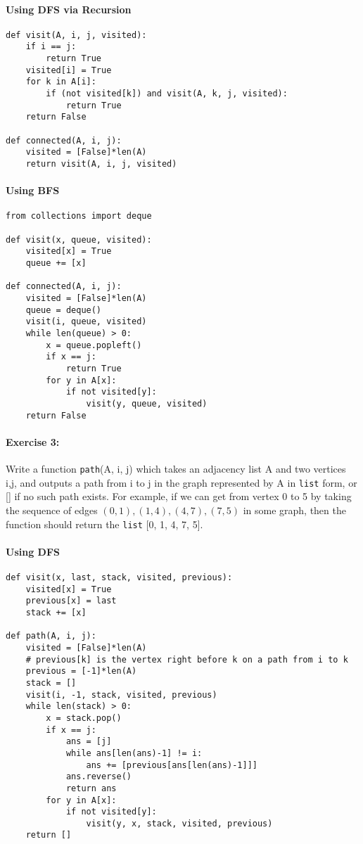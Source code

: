 \documentclass[11pt]{article}
\begin{document}
\paragraph{Using DFS via Recursion}

\begin{verbatim}
def visit(A, i, j, visited):
    if i == j:
        return True
    visited[i] = True
    for k in A[i]:
        if (not visited[k]) and visit(A, k, j, visited):
            return True
    return False

def connected(A, i, j):
    visited = [False]*len(A)
    return visit(A, i, j, visited)
\end{verbatim}

\paragraph{Using BFS}
\begin{verbatim}
from collections import deque

def visit(x, queue, visited):
    visited[x] = True
    queue += [x]

def connected(A, i, j):
    visited = [False]*len(A)
    queue = deque()
    visit(i, queue, visited)
    while len(queue) > 0:
        x = queue.popleft()
        if x == j:
            return True
        for y in A[x]:
            if not visited[y]:
                visit(y, queue, visited)
    return False
\end{verbatim}

\paragraph{Exercise 3:}
Write a function \texttt{path}(A, i, j) which takes an adjacency
list A and two vertices i,j, and outputs a path from i to j
in the graph represented by A in \texttt{list} form, or [] if no such
path exists.  For example, if we can get from vertex 0 to 5 by taking
the sequence of edges $(0,1), (1, 4), (4, 7), (7,5)$ in some graph,
then the function should return the \texttt{list} [0, 1, 4, 7, 5].

\paragraph{Using DFS}

\begin{verbatim}
def visit(x, last, stack, visited, previous):
    visited[x] = True
    previous[x] = last
    stack += [x]

def path(A, i, j):
    visited = [False]*len(A)
    # previous[k] is the vertex right before k on a path from i to k
    previous = [-1]*len(A)
    stack = []
    visit(i, -1, stack, visited, previous)
    while len(stack) > 0:
        x = stack.pop()
        if x == j:
            ans = [j]
            while ans[len(ans)-1] != i:
                ans += [previous[ans[len(ans)-1]]]
            ans.reverse()
            return ans
        for y in A[x]:
            if not visited[y]:
                visit(y, x, stack, visited, previous)
    return []
\end{verbatim}
\end{document}
